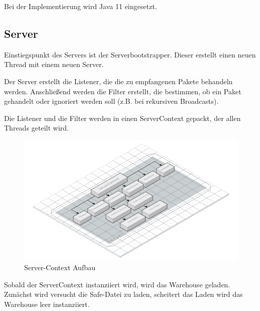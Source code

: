 
Bei der Implementierung wird Java 11 eingesetzt.
\subsection{Server}
Einstiegspunkt des Servers ist der Serverbootstrapper. Dieser erstellt einen neuen Thread mit einem neuen Server. 

Der Server erstellt die Listener, die die zu empfangenen Pakete behandeln werden. Anschließend werden die Filter erstellt, die bestimmen, ob ein Paket gehandelt oder ignoriert werden soll (z.B. bei rekursiven Broadcasts).


Die Listener und die Filter werden in einen ServerContext gepackt, der allen Threads geteilt wird.

\begin{figure}[h]
    \centering
    \includegraphics[width=\textwidth]{VS-Server-Context.png}
    
    \caption{Server-Context Aufbau}
    \label{}
\end{figure}

Sobald der ServerContext instanziiert wird, wird das Warehouse geladen. 
Zunächst wird versucht die Safe-Datei zu laden, scheitert das Laden wird das Warehouse leer instanziiert.


